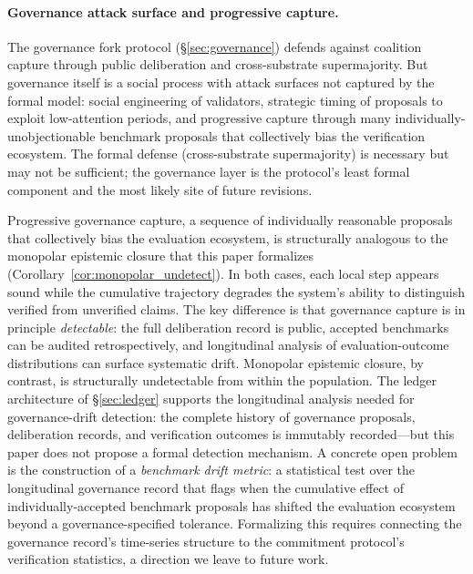 \paragraph{Governance attack surface and progressive capture.}
The governance fork protocol (\S\ref{sec:governance}) defends
against coalition capture through public deliberation and
cross-substrate supermajority.  But governance itself is a social
process with attack surfaces not captured by the formal model:
social engineering of validators, strategic timing of proposals to
exploit low-attention periods, and progressive capture through many
individually-unobjectionable benchmark proposals that collectively
bias the verification ecosystem.  The formal defense
(cross-substrate supermajority) is necessary but may not be
sufficient; the governance layer is the protocol's least formal
component and the most likely site of future revisions.

Progressive governance capture, a sequence of individually
reasonable proposals that collectively bias the evaluation
ecosystem, is structurally analogous to the monopolar epistemic
closure that this paper formalizes
(Corollary~\ref{cor:monopolar_undetect}).  In both cases, each
local step appears sound while the cumulative trajectory degrades
the system's ability to distinguish verified from unverified claims.
The key difference is that governance capture is in principle
\emph{detectable}: the full deliberation record is public, accepted
benchmarks can be audited retrospectively, and longitudinal analysis
of evaluation-outcome distributions can surface systematic drift.
Monopolar epistemic closure, by contrast, is structurally
undetectable from within the population.  The ledger architecture of
\S\ref{sec:ledger} supports the longitudinal analysis needed for
governance-drift detection: the complete history of governance
proposals, deliberation records, and verification outcomes is
immutably recorded---but this paper does not propose a formal
detection mechanism.  A concrete open problem is the construction
of a \emph{benchmark drift metric}: a statistical test over the
longitudinal governance record that flags when the cumulative effect
of individually-accepted benchmark proposals has shifted the
evaluation ecosystem beyond a governance-specified tolerance.
Formalizing this requires connecting the governance record's
time-series structure to the commitment protocol's verification
statistics, a direction we leave to future work.
